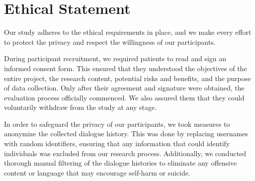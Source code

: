 \section{Ethical Statement}
\label{sec:ethics}

Our study adheres to the ethical requirements in place, and we make every effort to protect the privacy and respect the willingness of our participants.

During participant recruitment, we required patients to read and sign an informed consent form. This ensured that they understood the objectives of the entire project, the research content, potential risks and benefits, and the purpose of data collection. Only after their agreement and signature were obtained, the evaluation process officially commenced. We also assured them that they could voluntarily withdraw from the study at any stage.

In order to safeguard the privacy of our participants, we took measures to anonymize the collected dialogue history. This was done by replacing usernames with random identifiers, ensuring that any information that could identify individuals was excluded from our research process. Additionally, we conducted thorough manual filtering of the dialogue histories to eliminate any offensive content or language that may encourage self-harm or suicide.

